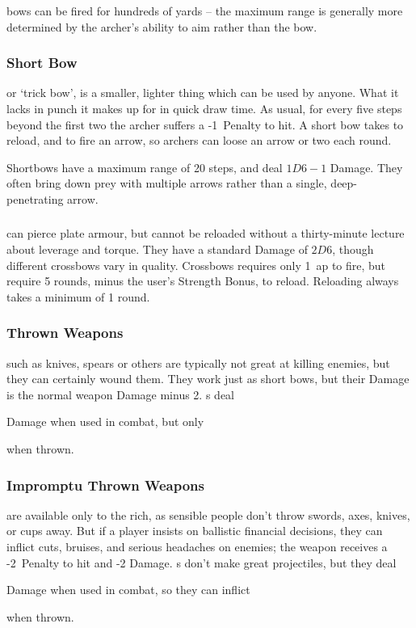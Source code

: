 \begin{multicols}{2}
\Glspl{bow} can be fired for hundreds of yards -- the maximum range is generally more determined by the archer's ability to aim rather than the bow.

\subsubsection{Short Bow}
or `trick bow', is a smaller, lighter thing which can be used by anyone.
What it lacks in punch it makes up for in quick draw time.
As usual, for every five steps beyond the first two the archer suffers a -1~Penalty to hit.
A short bow takes  to reload, and  to fire an arrow, so archers can loose an arrow or two each round.

Shortbows have a maximum range of 20 steps, and deal $1D6-1$ Damage.
They often bring down prey with multiple arrows rather than a single, deep-penetrating arrow.

\subsubsection{}
\label{crossbow}
can pierce plate armour, but cannot be reloaded without a thirty-minute lecture about leverage and torque.
They have a standard Damage of $2D6$, though different crossbows vary in quality.
Crossbows requires only 1~\gls{ap} to fire, but require 5 \glspl{round}, minus the user's Strength Bonus, to reload.
Reloading always takes a minimum of 1 \gls{round}.

\subsubsection{Thrown Weapons}
such as knives, spears or others are typically not great at killing enemies, but they can certainly wound them.
They work just as short bows, but their Damage is the normal weapon Damage minus 2.
\javelin\weaponName s deal
\addtocounter{weaponDamage}{4}
 Damage
when used in combat, but only
\addtocounter{weaponDamage}{-2}%
 when thrown.

\subsubsection{Impromptu Thrown Weapons}
are available only to the rich, as sensible people don't throw swords, axes, knives, or cups away.
But if a player insists on ballistic financial decisions, they can inflict cuts, bruises, and serious headaches on enemies; the weapon receives a -2~Penalty to hit and -2 Damage.
\longsword\weaponName s don't make great projectiles, but they deal
\addtocounter{weaponDamage}{4}
 Damage
when used in combat, so they can inflict
\addtocounter{weaponDamage}{-2}%
 when thrown.

\end{multicols}

